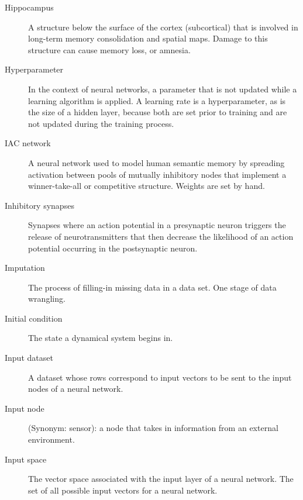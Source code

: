 \begin{description}
\item[Hippocampus] A structure below the surface of the cortex (subcortical) that is involved in long-term memory consolidation and spatial maps. Damage to this structure can cause memory loss, or amnesia. 


\item[Hyperparameter] In the context of neural networks, a parameter that is not updated while a learning algorithm is applied. A learning rate is a hyperparameter, as is the size of a hidden layer, because both are set prior to training and are not updated during the training process.

\item[IAC network] A neural network used to model human semantic memory by spreading activation between pools of mutually inhibitory nodes that implement a winner-take-all or competitive structure. Weights are set by hand. 

\item[Inhibitory synapses] Synapses where an action potential in a presynaptic neuron triggers the release of neurotransmitters that then decrease the likelihood of an action potential occurring in the postsynaptic neuron.

\item[Imputation] The process of filling-in missing data in a data set. One stage of data wrangling.

\item[Initial condition] The state a dynamical system begins in.

\item[Input dataset] A dataset whose rows correspond to input vectors to be sent to the input nodes of a neural network.

\item[Input node] (Synonym: sensor): a node that takes in information from an external environment. 

\item[Input space] The vector space associated with the input layer of a neural network. The set of all possible input vectors for a neural network.





\end{description}
